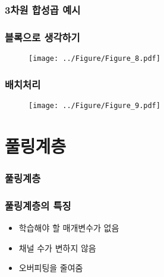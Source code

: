 \documentclass{beamer}
\begin{document}
\begin{frame}
	\frametitle{3차원 합성곱 예시}
	\begin{figure}
		\hspace{0.5cm}
	\end{figure}
\end{frame}

\begin{frame}
	\frametitle{블록으로 생각하기}
	\begin{figure}
		\texttt{[image: ../Figure/Figure\_8.pdf]}
	\end{figure}
\end{frame}

\begin{frame}
	\frametitle{배치처리}
	\begin{figure}
		\texttt{[image: ../Figure/Figure\_9.pdf]}
	\end{figure}
\end{frame}

\section{풀링계층}
	\begin{frame}
		\frametitle{풀링계층}
		\begin{figure}
		\end{figure}
\end{frame}

\begin{frame}
	\frametitle{풀링계층의 특징}
		\begin{itemize}
			\item 학습해야 할 매개변수가 없음
			\item 채널 수가 변하지 않음
			\item 오버피팅을 줄여줌
			\begin{figure}
			\end{figure}
		\end{itemize}
\end{frame}
\end{document}
